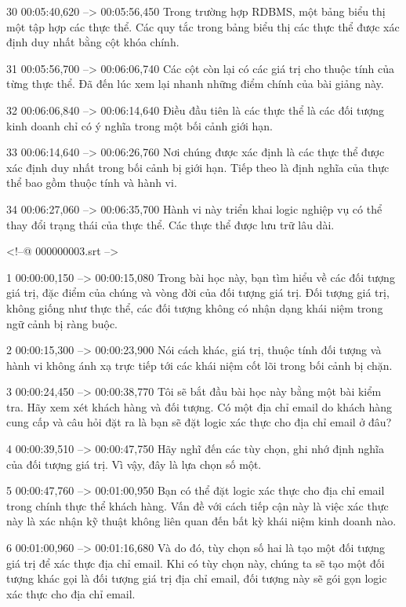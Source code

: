 30
00:05:40,620 --> 00:05:56,450
Trong trường hợp RDBMS, một bảng biểu thị một tập hợp các thực thể.  Các quy tắc trong bảng biểu thị các thực thể được xác định duy nhất bằng cột khóa chính.

31
00:05:56,700 --> 00:06:06,740
Các cột còn lại có các giá trị cho thuộc tính của từng thực thể.  Đã đến lúc xem lại nhanh những điểm chính của bài giảng này.

32
00:06:06,840 --> 00:06:14,640
Điều đầu tiên là các thực thể là các đối tượng kinh doanh chỉ có ý nghĩa trong một bối cảnh giới hạn.

33
00:06:14,640 --> 00:06:26,760
Nơi chúng được xác định là các thực thể được xác định duy nhất trong bối cảnh bị giới hạn.  Tiếp theo là định nghĩa của thực thể bao gồm thuộc tính và hành vi.

34
00:06:27,060 --> 00:06:35,700
Hành vi này triển khai logic nghiệp vụ có thể thay đổi trạng thái của thực thể.  Các thực thể được lưu trữ lâu dài.

<!--@ 000000003.srt -->

1
00:00:00,150 --> 00:00:15,080
Trong bài học này, bạn tìm hiểu về các đối tượng giá trị, đặc điểm của chúng và vòng đời của đối tượng giá trị. Đối tượng giá trị, không giống như thực thể, các đối tượng không có nhận dạng khái niệm trong ngữ cảnh bị ràng buộc.

2
00:00:15,300 --> 00:00:23,900
Nói cách khác, giá trị, thuộc tính đối tượng và hành vi không ánh xạ trực tiếp tới các khái niệm cốt lõi trong bối cảnh bị chặn.

3
00:00:24,450 --> 00:00:38,770
Tôi sẽ bắt đầu bài học này bằng một bài kiểm tra.  Hãy xem xét khách hàng và đối tượng.  Có một địa chỉ email do khách hàng cung cấp và câu hỏi đặt ra là bạn sẽ đặt logic xác thực cho địa chỉ email ở đâu?

4
00:00:39,510 --> 00:00:47,750
Hãy nghĩ đến các tùy chọn, ghi nhớ định nghĩa của đối tượng giá trị.  Vì vậy, đây là lựa chọn số một.

5
00:00:47,760 --> 00:01:00,950
Bạn có thể đặt logic xác thực cho địa chỉ email trong chính thực thể khách hàng.  Vấn đề với cách tiếp cận này là việc xác thực này là xác nhận kỹ thuật không liên quan đến bất kỳ khái niệm kinh doanh nào.

6
00:01:00,960 --> 00:01:16,680
Và do đó, tùy chọn số hai là tạo một đối tượng giá trị để xác thực địa chỉ email.  Khi có tùy chọn này, chúng ta sẽ tạo một đối tượng khác gọi là đối tượng giá trị địa chỉ email, đối tượng này sẽ gói gọn logic xác thực cho địa chỉ email.


